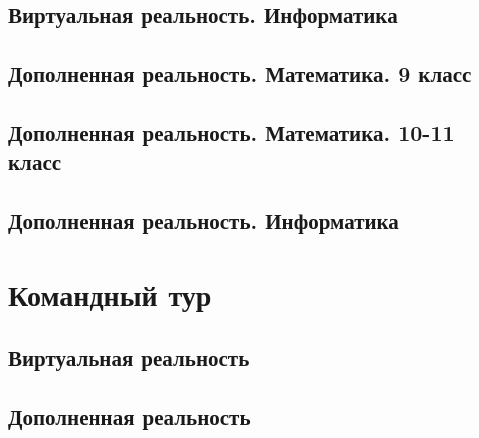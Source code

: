 \documentclass[a4paper,12pt,oneside]{book}
\begin{document}
\section{Виртуальная реальность. Информатика}


\section{Дополненная реальность. Математика. 9 класс}


\section{Дополненная реальность. Математика. 10-11 класс}


\section{Дополненная реальность. Информатика}


\chapter{Командный тур}

\section{Виртуальная реальность}


\section{Дополненная реальность} 



\end{document}

